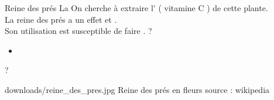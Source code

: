 \label{reinepres}
\ficheidentiteplante
{Reine des prés}
{%
    La  
}
{%
    On cherche à extraire l' ( vitamine C ) de cette plante. \\

    La reine des prés a un effet  et .\\

    Son utilisation est susceptible de faire .
}
{%
    ?
}
{%
    \begin{itemize}[label = \bcplume]
        \item 
    \end{itemize}
}
{%
    \begin{Remarque}
        ?
    \end{Remarque}
}
{%
    downloads/reine_des_pres.jpg
}
{%
    Reine des prés en fleurs
}
{%
    source : wikipedia
}